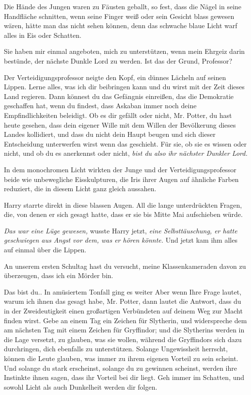 Die Hände des Jungen waren zu Fäusten geballt, so fest, dass die Nägel in seine
Handfläche schnitten, wenn seine Finger weiß oder sein Gesicht blass gewesen
wären, hätte man das nicht sehen können, denn das schwache blaue Licht warf
alles in Eis oder Schatten.

\glqq{}Sie haben mir einmal angeboten, mich zu unterstützen, wenn mein Ehrgeiz
darin bestünde, der nächste Dunkle Lord zu werden. Ist das der Grund,
Professor?\grqq{}

Der Verteidigungsprofessor neigte den Kopf, ein dünnes Lächeln auf seinen
Lippen. \glqq{}Lerne alles, was ich dir beibringen kann und du wirst mit der Zeit
dieses Land regieren. Dann könnest du das Gefängnis einreißen, das die
Demokratie geschaffen hat, wenn du findest, dass Askaban immer noch deine
Empfindlichkeiten beleidigt. Ob es dir gefällt oder nicht, Mr. Potter, du hast
heute gesehen, dass dein eigener Wille mit dem Willen der Bevölkerung dieses
Landes kollidiert, und dass du nicht dein Haupt beugen und sich dieser
Entscheidung unterwerfen wirst wenn das geschieht. Für sie, ob sie es wissen
oder nicht, und ob du es anerkennst oder nicht,\emph{ bist du also ihr nächster
Dunkler Lord.}\grqq{}

In dem monochromen Licht wirkten der Junge und der Verteidigungsprofessor beide
wie unbewegliche Eisskulpturen, die Iris ihrer Augen auf ähnliche Farben
reduziert, die in diesem Licht ganz gleich aussahen.

Harry starrte direkt in diese blassen Augen. All die lange unterdrückten Fragen,
die, von denen er sich gesagt hatte, dass er sie bis Mitte Mai aufschieben
würde.

\emph{Das war eine Lüge gewesen,} wusste Harry jetzt, \emph{eine
Selbsttäuschung, er hatte geschwiegen aus Angst vor dem, was er hören könnte.}
Und jetzt kam ihm alles auf einmal über die Lippen.

\glqq{}An unserem ersten Schultag hast du versucht, meine Klassenkameraden davon
zu überzeugen, dass ich ein Mörder bin.\grqq{}

\glqq{}Das bist du.\grqq{}. In amüsiertem Tonfall ging es weiter \glqq{}Aber wenn
Ihre Frage lautet, warum ich ihnen das gesagt habe, Mr. Potter, dann lautet die
Antwort, dass du in der Zweideutigkeit einen großartigen Verbündeten auf deinem
Weg zur Macht finden wirst. Gebe an einem Tag ein Zeichen für Slytherin, und
widerspreche dem am nächsten Tag mit einem Zeichen für Gryffindor; und die
Slytherins werden in die Lage versetzt, zu glauben, was sie wollen, während die
Gryffindors sich dazu durchringen, dich ebenfalls zu unterstützen. Solange
Ungewissheit herrscht, können die Leute glauben, was immer zu ihrem eigenen
Vorteil zu sein scheint. Und solange du stark erscheinst, solange du zu gewinnen
scheinst, werden ihre Instinkte ihnen sagen, dass ihr Vorteil bei dir liegt. Geh
immer im Schatten, und sowohl Licht als auch Dunkelheit werden dir
folgen.\grqq{}

